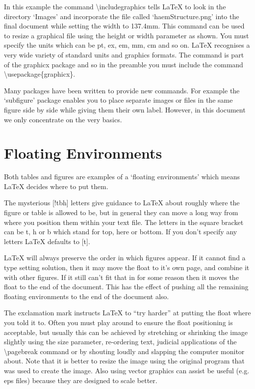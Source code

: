 In this example the command {\textbackslash}includegraphics tells LaTeX to look in the directory `Images' and incorporate the file called `haemStructure.png' into the final document while setting the width to 137.4mm.  This command can be used to resize a graphical file using the height or width parameter as shown. You must specify the units which can be pt, ex, em, mm, cm and so on. LaTeX recognises a very wide variety of standard units and graphics formats. The command is part of the graphicx package and so in the preamble you must include the command {\textbackslash}usepackage\{graphicx\}.

Many packages have been written to provide new commands. For example the `subfigure' package enables you to place separate images or files in the same figure side by side while giving them their own label. However, in this document we only concentrate on the very basics.

\section{Floating Environments}

Both tables and figures are examples of a `floating environments' which means LaTeX decides where to put them. 

The mysterious [!tbh] letters give guidance to LaTeX about roughly where the figure or table is  allowed to be, but in general they can move a long way from where you position them within your text file.  The letters in the square bracket can be t, h or b which stand for top, here or bottom.  If you don't specify any letters LaTeX defaults to [t].

LaTeX will always preserve the order in which figures appear.  If it cannot find a type setting solution, then it may move the float to it's own page, and combine it with other figures. If it still can't fit that in for some reason then it moves the float to the end of the document.  This has the effect of pushing all the remaining floating environments to the end of the document also.

The exclamation mark instructs LaTeX to ``try harder'' at putting the float where you told it to. Often you must play around to ensure the float positioning is acceptable, but usually this can be achieved by stretching or shrinking the image slightly using the size parameter, re-ordering text, judicial applications of the {\textbackslash}pagebreak command or by shouting loudly and slapping the computer monitor about. Note that it is better to resize the image using the original program that was used to create the image. Also using vector graphics can assist be useful (e.g. eps files) because they are designed to scale better.